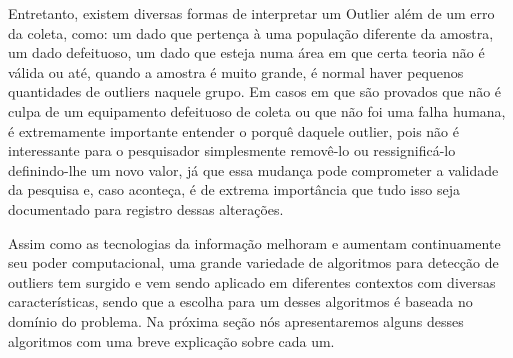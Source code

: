 
Entretanto, existem diversas formas de interpretar um Outlier além de um erro da coleta, como: um dado que pertença à uma população diferente da amostra, um dado defeituoso, um dado que esteja numa área em que certa teoria não é válida ou até, quando a amostra é muito grande, é normal haver pequenos quantidades de outliers naquele grupo. Em casos em que são provados que não é culpa de um equipamento defeituoso de coleta ou que não foi uma falha humana, é extremamente importante entender o porquê daquele outlier, pois não é interessante para o pesquisador simplesmente removê-lo ou ressignificá-lo definindo-lhe um novo valor, já que essa mudança pode comprometer a validade da pesquisa e, caso aconteça, é de extrema importância que tudo isso seja documentado para registro dessas alterações.


Assim como as tecnologias da informação melhoram e aumentam continuamente seu poder computacional, uma grande variedade de algoritmos para detecção de outliers tem surgido e vem sendo aplicado em diferentes contextos com diversas características, sendo que a escolha para um desses algoritmos é baseada no domínio do problema. Na próxima seção nós apresentaremos alguns desses algoritmos com uma breve explicação sobre cada um.

